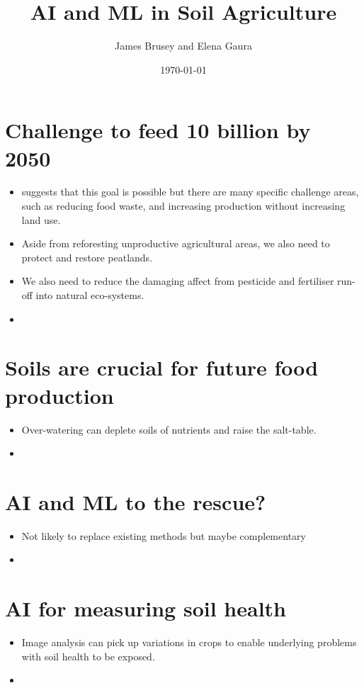 \documentclass[11pt]{article}
\author{James Brusey and Elena Gaura}
\date{\today}
\title{AI and ML in Soil Agriculture}
\begin{document}
\maketitle


\section{Challenge to feed 10 billion by 2050}
\label{sec:org8a573b6}
\begin{itemize}
\item \cite{searchingerCreatingSustainableFood2019} suggests that this goal is possible but there are many specific challenge areas, such as reducing food waste, and increasing production without increasing land use.
\item Aside from reforesting unproductive agricultural areas, we also need to protect and restore peatlands.
\item We also need to reduce the damaging affect from pesticide and fertiliser run-off into natural eco-systems.
\item 
\end{itemize}
\section{Soils are crucial for future food production}
\label{sec:org5319097}
\begin{itemize}
\item Over-watering can deplete soils of nutrients and raise the salt-table.
\item 
\end{itemize}
\section{AI and ML to the rescue?}
\label{sec:org3f851ef}
\begin{itemize}
\item Not likely to replace existing methods but maybe complementary
\item 
\end{itemize}
\section{AI for measuring soil health}
\label{sec:org9c56d30}
\begin{itemize}
\item Image analysis can pick up variations in crops to enable underlying problems with soil health to be exposed.
\item 
\end{itemize}
\end{document}
